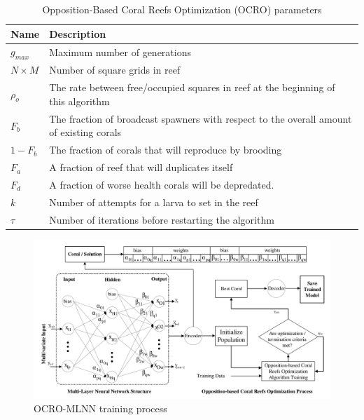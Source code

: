 \documentclass[11pt,twoside]{article}
\begin{document}
\begin{multicols}{2}
\begin{table}[!t]
\begin{center}
\begin{tabular}{ C{1.5cm}| L{14cm}  } 
\textbf{Name} & \textbf{Description} \\ 		\hline
$g_{max}$ 	& Maximum number of generations \\ 	%
$N \times M$ 	& Number of square grids in reef \\ 		%
$\rho_{o}$ 	& The rate between free/occupied squares in reef at the beginning of this algorithm \\ 		%
$F_{b}$ 		& The fraction of broadcast spawners with respect to the overall amount of existing corals \\ 	%
$1 - F_{b}$ 	& The fraction of corals that will reproduce by brooding \\ 	%
$F_{a}$ 		& A fraction of reef that will duplicates itself \\ 				%
$F_{d}$ 		& A fraction of worse health corals will be depredated.  \\ 		%
$k$ 			& Number of attempts for a larva to set in the reef \\ 				%
$\tau$ 		& Number of iterations before restarting the algorithm \\ 					%
\end{tabular}
\end{center}
\caption{Opposition-Based Coral Reefs Optimization (OCRO) parameters}
\label{table:ocro_paras}
\end{table}

\begin{figure}[!t]
	\begin{center}
		\includegraphics[width=1.0\textwidth =0cm 0cm 0cm 0cm, clip]{system/cro_training_final.pdf}
		\caption{OCRO-MLNN training process}
		\label{fig_ocro_training}
	\end{center}
\end{figure}


\end{multicols}
\end{document}
